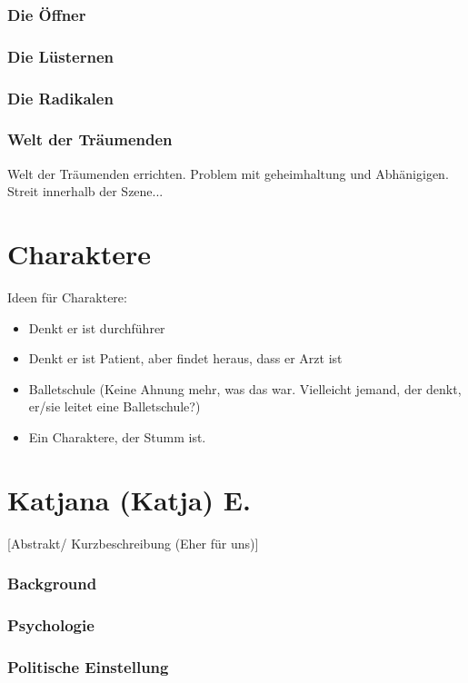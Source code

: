 \documentclass[12pt, a4paper, openany]{report}
\begin{document}
\subsubsection{Die Öffner}

\subsubsection{Die Lüsternen}

\subsubsection{Die Radikalen}

\subsubsection{Welt der Träumenden}

Welt der Träumenden errichten. Problem mit geheimhaltung und Abhänigigen. Streit innerhalb der Szene...

\section{Charaktere}
Ideen für Charaktere:
\begin{itemize}
\item Denkt er ist durchführer
\item Denkt er ist Patient, aber findet heraus, dass er Arzt ist
\item Balletschule (Keine Ahnung mehr, was das war. Vielleicht jemand, der denkt, er/sie leitet eine Balletschule?)
\item Ein Charaktere, der Stumm ist.
\end{itemize}

\section{Katjana (Katja) E.}
[Abstrakt/ Kurzbeschreibung (Eher für uns)]
\subsubsection{Background}

\subsubsection{Psychologie}
\subsubsection{Politische Einstellung}
\end{document}
